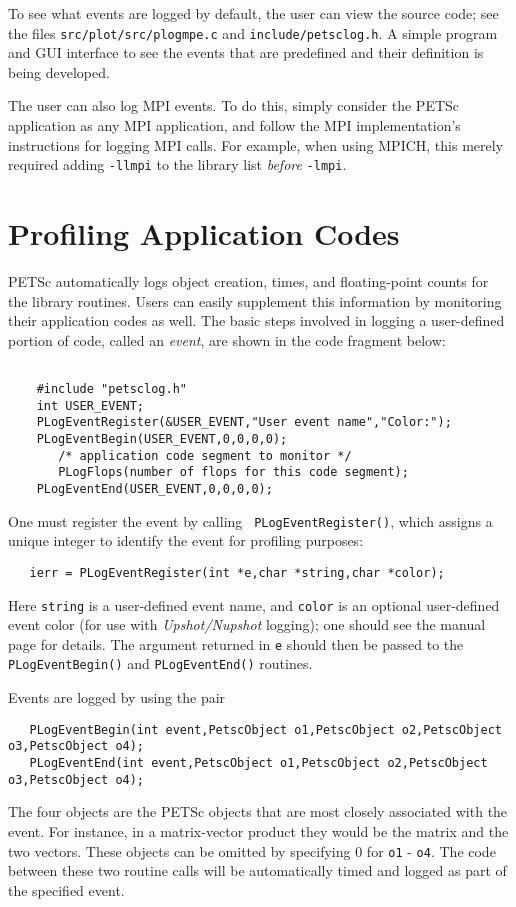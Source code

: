 To see what events are logged by default, the user can view the source code; see
the files {\tt src/plot/src/plogmpe.c} and {\tt include/petsclog.h}.  A simple program and
GUI interface to see the events that are predefined and their definition is 
being developed.

The user can also log MPI events.  To do this, simply consider the
PETSc application as any MPI application, and follow the MPI
implementation's instructions for logging MPI calls. For example, when
using MPICH, this merely required adding {\tt -llmpi} to the library
list {\em before} {\tt -lmpi}.

\section{Profiling Application Codes}
\label{sec:profileuser}

PETSc automatically logs object creation, times, and floating-point
counts for the library routines. Users can easily supplement
this information by monitoring their application codes as well.  
The basic steps involved in logging a
user-defined portion of code, called an {\em event}, are shown in the 
code fragment below:
\begin{verbatim}

    #include "petsclog.h"
    int USER_EVENT;
    PLogEventRegister(&USER_EVENT,"User event name","Color:");
    PLogEventBegin(USER_EVENT,0,0,0,0);
       /* application code segment to monitor */
       PLogFlops(number of flops for this code segment);
    PLogEventEnd(USER_EVENT,0,0,0,0);

\end{verbatim}

One must register the event by calling {\tt
PLogEventRegister()}, which assigns a unique integer to identify the
event for profiling purposes: 
\begin{verbatim}
   ierr = PLogEventRegister(int *e,char *string,char *color);
\end{verbatim}
Here {\tt string} is a user-defined event name, and {\tt color} is an
optional user-defined event color (for use with {\em Upshot/Nupshot} logging);
one should see the manual page for details.  The argument returned in {\tt e} should then
be passed to the {\tt PLogEventBegin()} and {\tt PLogEventEnd()}
routines.

Events are logged by using the pair 
\begin{verbatim}
   PLogEventBegin(int event,PetscObject o1,PetscObject o2,PetscObject o3,PetscObject o4);
   PLogEventEnd(int event,PetscObject o1,PetscObject o2,PetscObject o3,PetscObject o4);
\end{verbatim}
The 
four objects are the PETSc objects that are most closely associated 
with the event.  For instance, in a matrix-vector product they 
would be the matrix and the two vectors.  These objects can be omitted
by specifying 0 for {\tt o1} - {\tt o4}.  The code between these 
two routine calls will be automatically timed and logged as part of the
specified event.

